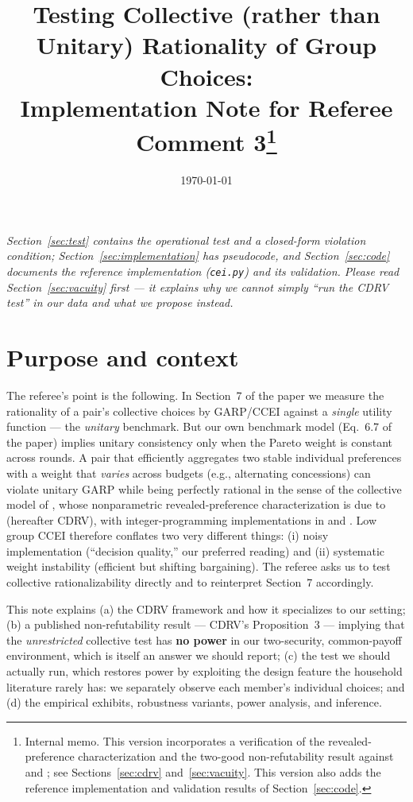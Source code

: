 \documentclass[11pt]{article}
\title{Testing Collective (rather than Unitary) Rationality of Group Choices:\\
Implementation Note for Referee Comment 3\thanks{Internal memo. This version incorporates a verification of the revealed-preference characterization and the two-good non-refutability result against \citet{cherchye2007} and \citet{cherchye2011}; see Sections~\ref{sec:cdrv} and~\ref{sec:vacuity}. This version also adds the reference implementation and validation results of Section~\ref{sec:code}.}}
\author{}
\date{\today}
\theoremstyle{remark}
\begin{document}
\maketitle

\noindent\emph{Section~\ref{sec:test} contains the operational test and a closed-form violation condition; Section~\ref{sec:implementation} has pseudocode, and Section~\ref{sec:code} documents the reference implementation (\texttt{cei.py}) and its validation. Please read Section~\ref{sec:vacuity} first --- it explains why we cannot simply ``run the CDRV test'' in our data and what we propose instead.}

\section{Purpose and context}\label{sec:purpose}

The referee's point is the following. In Section~7 of the paper we measure the rationality of a pair's collective choices by GARP/CCEI against a \emph{single} utility function --- the \emph{unitary} benchmark. But our own benchmark model (Eq.~6.7 of the paper) implies unitary consistency only when the Pareto weight is constant across rounds. A pair that efficiently aggregates two stable individual preferences with a weight that \emph{varies} across budgets (e.g., alternating concessions) can violate unitary GARP while being perfectly rational in the sense of the collective model of \citet{chiappori1988,chiappori1992}, whose nonparametric revealed-preference characterization is due to \citet{cherchye2007} (hereafter CDRV), with integer-programming implementations in \citet{cherchye2008IP} and \citet{cherchye2011}. Low group CCEI therefore conflates two very different things: (i) noisy implementation (``decision quality,'' our preferred reading) and (ii) systematic weight instability (efficient but shifting bargaining). The referee asks us to test collective rationalizability directly and to reinterpret Section~7 accordingly.

This note explains (a) the CDRV framework and how it specializes to our setting; (b) a published non-refutability result --- CDRV's Proposition~3 --- implying that the \emph{unrestricted} collective test has \textbf{no power} in our two-security, common-payoff environment, which is itself an answer we should report; (c) the test we should actually run, which restores power by exploiting the design feature the household literature rarely has: we separately observe each member's individual choices; and (d) the empirical exhibits, robustness variants, power analysis, and inference.
\end{document}
